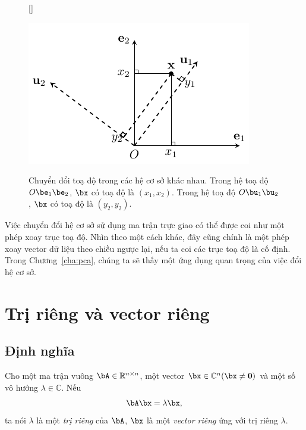 \begin{figure}[t]
    [\FBwidth]
    {\caption{
    Chuyển đổi toạ độ trong các hệ cơ sở khác nhau. Trong hệ toạ độ
    $O\be_1\be_2$, $\bx$ có toạ độ là $(x_1, x_2)$. Trong hệ toạ độ
    $O\bu_1\bu_2$, $\bx$ có toạ độ là $(y_2, y_2)$.
    }
    \label{fig:change_basis}}
    { %
    \includegraphics[width=.5\textwidth]{Chapters/07_DimemsionalityReduction/27_pca/latex/changebasis.pdf}
    }
\end{figure}


Việc chuyển đổi hệ cơ sở sử dụng ma trận trực giao có thể được coi như một phép
xoay trục toạ độ. Nhìn theo một cách khác, đây cũng chính là một phép xoay
vector dữ liệu theo chiều ngược lại, nếu ta coi các trục toạ độ là cố định.
Trong Chương~\ref{cha:pca}, chúng ta sẽ thấy một ứng dụng quan trọng của
việc đổi hệ cơ sở.



\section{Trị riêng và vector riêng} %
 \label{sec:tri_rieng_ve_vector_rieng}

\subsection{Định nghĩa} %
\label{sub:dinh_nghia}


Cho một ma trận vuông $\bA \in \mathbb{R}^{n\times n}$, một vector $\bx \in \mathbb{C}^n (\bx
\neq \mathbf{0} )$ và một số vô hướng $\lambda \in \mathbb{C}$. Nếu
\begin{equation}
    \bA\bx = \lambda \bx,
\end{equation}
 ta nói $\lambda$ là một \textit{trị riêng} của $\bA$, $\bx$ là một \textit{vector riêng} ứng với trị riêng $\lambda$.

